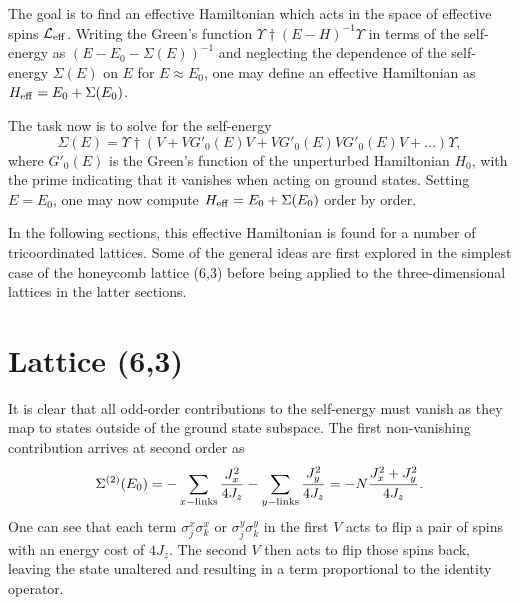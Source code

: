 The goal is to find an effective Hamiltonian which acts in the space of effective spins $\mathcal{L}_{\rm eff}$.
Writing the Green's function $\Upsilon\dag (E - H)^{-1} \Upsilon$ in terms of the self-energy as $(E - E_0 - \Sigma(E))^{-1}$ and neglecting the dependence of the self-energy $\Sigma(E)$ on $E$ for $E \approx E_0$, one may define an effective Hamiltonian as $H_{\rm eff} = E_0 + \Sigma(E_0)$.

The task now is to solve for the self-energy
%
\begin{equation}
	\Sigma(E) = \Upsilon\dag (V + V G'_0(E) V + V G'_0(E) V G'_0(E) V + \dots) \Upsilon,
	\label{eq:self-energy}
\end{equation}
%
where $G'_0(E)$ is the Green's function of the unperturbed Hamiltonian $H_0$, with the prime indicating that it vanishes when acting on ground states.
Setting $E = E_0$, one may now compute $H_{\rm eff} = E_0 + \Sigma(E_0)$ order by order.

In the following sections, this effective Hamiltonian is found for a number of tricoordinated lattices.
Some of the general ideas are first explored in the simplest case of the honeycomb lattice (6,3) before being applied to the three-dimensional lattices in the latter sections.


%
%
\section{Lattice (6,3)}
\label{appendix:LoopModels_6_3}
%
%
It is clear that all odd-order contributions to the self-energy must vanish as they map to states outside of the ground state subspace.
The first non-vanishing contribution arrives at second order as
%
\begin{equation}
	\Sigma^{(2)}(E_0) = -\sum_{x \rm-links} \frac{J_x^2}{4 J_z} - \sum_{y \rm-links} \frac{J_y^2}{4 J_z} = -N \frac{J_x^2 + J_y^2}{4 J_z}.
\end{equation}
%
One can see that each term $\sigma_j^x \sigma_k^x$ or $\sigma_j^y \sigma_k^y$ in the first $V$ acts to flip a pair of spins with an energy cost of $4 J_z$.
The second $V$ then acts to flip those spins back, leaving the state unaltered and resulting in a term proportional to the identity operator.

